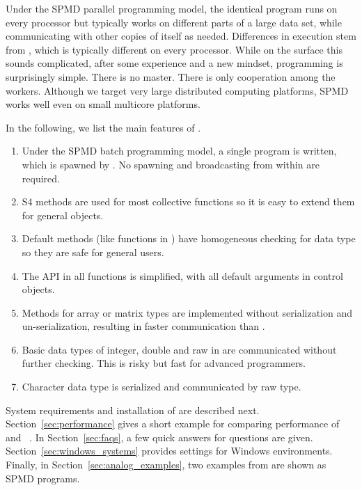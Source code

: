 Under the SPMD parallel programming model, the identical program runs
on every processor but typically works on different parts of a large
data set, while communicating with other copies of itself as
needed. Differences in execution stem from , which is
typically different on every processor. While on the surface this
sounds complicated, after some experience and a new mindset,
programming is surprisingly simple. There is no master. There is only
cooperation among the workers. Although we target very large
distributed computing platforms, SPMD works well even on small
multicore platforms.

In the following, we list the main features of .
\begin{enumerate}
\item Under the SPMD batch programming model, a single program is
  written, which is spawned by . No spawning
  and broadcasting from within  are required.
\item S4 methods are used for most collective functions so it is easy
  to extend them for general  objects.
\item Default methods (like  functions in ) have
  homogeneous checking for data type so they are safe for general
  users.
\item The API in all functions is simplified, with all default arguments
  in control objects.
\item Methods for array or matrix types are implemented without
  serialization and un-serialization, resulting in faster
  communication than .
\item Basic data types of integer, double and raw in  are
  communicated without further checking. This is risky but fast for
  advanced programmers.
\item Character data type is serialized and communicated by raw type.
\end{enumerate}

System requirements and installation of  are described
next.  Section~\ref{sec:performance} gives a short example for
comparing performance of  and ~\citep{Yu2010}.
In Section~\ref{sec:faqs}, a few quick answers for questions are
given.  Section~\ref{sec:windows_systems} provides settings for
Windows environments.  Finally, in Section~\ref{sec:analog_examples},
two examples from  are shown as SPMD 
programs.

